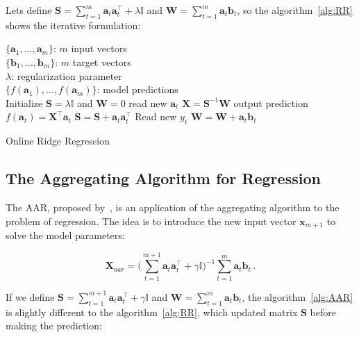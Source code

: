 Lets define $\displaystyle\mathbf{S}= \sum_{t=1}^m \mathbf{a}_t
\mathbf{a}_t  ^\top + \lambda \mathbb{I} $ and $\mathbf{W}=
\displaystyle\sum_{t=1}^m \mathbf{a}_t \mathbf{b}_t$, so the
algorithm~\ref{alg:RR} shows the iterative formulation:

\begin{algorithm}[H]
\begin{algorithmic}[1]
\REQUIRE $\,$ \\
$\{\mathbf{a}_1,\dots,\mathbf{a}_{m} \}$: $m$ input vectors \\
$\{\mathbf{b}_1,\dots,\mathbf{b}_{m} \}$: $m$ target vectors \\
$\lambda$: regularization parameter \\
\ENSURE  $\,$ \\
$\{f(\mathbf{a}_1),\dots,f(\mathbf{a}_{m}) \}$: model predictions \\
\STATE Initialize $\mathbf{S}=\lambda \mathbb{I}$
and $\mathbf{W}=0$
	\STATE read new $\mathbf{a}_t$
	\STATE $\mathbf{X}=\mathbf{S}^{-1}\mathbf{W}$
	\STATE output prediction $f(\mathbf{a}_t) = \mathbf{X}^\top \mathbf{a}_t$
   	\STATE $\mathbf{S} = \mathbf{S} + \mathbf{a}_t \mathbf{a}_t^\top$
   	\STATE Read new $y_t$
    	\STATE $\mathbf{W} = \mathbf{W} + \mathbf{a}_t \mathbf{b}_t$
\ENDFOR
\end{algorithmic}
\caption{Online Ridge Regression}
\label{alg:RR}
\end{algorithm}



\subsection{The Aggregating Algorithm for Regression}

The AAR, proposed by~\cite{vovk2001}, is an application of the aggregating
algorithm to the problem of regression. The idea is to introduce the new input
vector $\mathbf{x}_{m+1}$ to solve the model parameters: 

\begin{equation}
\label{eq:AARexpand}
\mathbf{X}_{aar} = \displaystyle \big (\sum_{t=1}^{m+1}
\mathbf{a}_t \mathbf{a}_t  ^\intercal + \gamma \mathbb{I}\big )^{-1}
\sum_{t=1}^m \mathbf{a}_t \mathbf{b}_t \, .
\end{equation}

If we define $\displaystyle\mathbf{S}= \sum_{t=1}^{m+1} \mathbf{a}_t
\mathbf{a}_t  ^\intercal + \gamma \mathbb{I} $ and $\mathbf{W}=
\displaystyle\sum_{t=1}^m \mathbf{a}_t \mathbf{b}_t$, the
algorithm~\ref{alg:AAR} is slightly different to the algorithm~\ref{alg:RR}, 
which updated matrix $\mathbf{S}$ before making the prediction:

